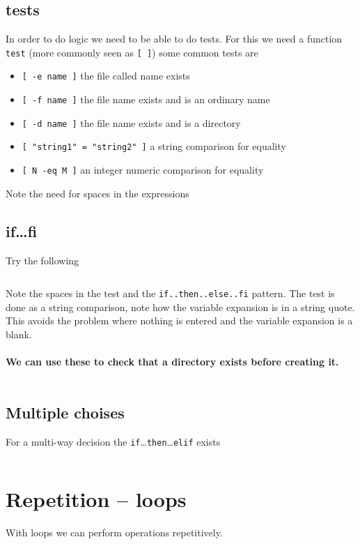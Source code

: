 \documentclass{article}
\begin{document}
\subsection{tests}
In order to do logic we need to be able to do tests.  For this we need
a function \texttt{test} (more commonly seen as \texttt{[ ]}) some
common tests are
\begin{itemize}
\item \verb*:[ -e name ]: the file called name exists
\item \verb*:[ -f name ]: the file name exists and is an ordinary name
\item \verb*:[ -d name ]: the file name exists and is a directory
\item \verb*:[ "string1" = "string2" ]: a string comparison for equality
\item \verb*:[ N -eq M ]: an integer numeric comparison for equality
\end{itemize}
Note the need for spaces in the expressions

\subsection{if\ldots fi}
Try the following
\inputminted[frame=leftline,rulecolor=\color{Green},framerule=3pt]{bash}{scripts/life}
Note the spaces in the test and the \texttt{if..then..else..fi}
pattern.  The test is done as a string comparison, note how the
variable expansion is in a string quote.  This avoids the problem
where nothing is entered and the variable expansion is a blank.

\clearpage
\paragraph{We can use these to check that a directory exists before creating it.}
\inputminted[frame=leftline,rulecolor=\color{Green},framerule=3pt]{bash}{scripts/dirchk}

\subsection{Multiple choises}
For a multi-way decision the
\texttt{if}\ldots\texttt{then}\ldots\texttt{elif} exists
\inputminted[frame=leftline,rulecolor=\color{Navy},framerule=1pt]{bash}{scripts/ifelif}


\section{Repetition -- loops}
With loops we can perform operations repetitively.
\end{document}
